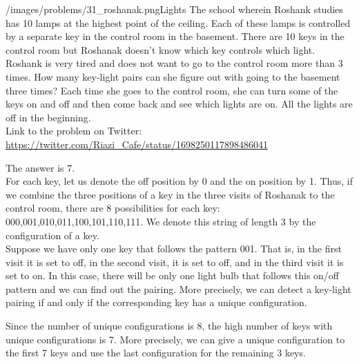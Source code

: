 \begin{problem}{/images/problems/31_roshanak.png}{Lights} 
    The school wherein Roshank studies has 10 lamps at the highest point of the ceiling. Each of these lamps is controlled by a separate key in the control room in the basement. There are 10 keys in the control room but Roshanak doesn't know which key controls which light.\\[0.2cm]

Roshank is very tired and does not want to go to the control room more than 3 times. How many key-light pairs can she figure out with going to the basement three times? Each time she goes to the control room, she can turn some of the keys on and off and then come back and see which lights are on. All the lights are off in the beginning.\\[0.2cm]

Link to the problem on Twitter:  \url{https://twitter.com/Riazi_Cafe/status/1698250117898486041}
\end{problem}
\begin{solution}
The answer is  7.\\[0.2cm]

For each key, let us denote the off position by 0 and the on position by 1. Thus, if we combine the three positions of a key in the three visits of Roshanak to the control room, there are 8 possibilities for each key: 000,001,010,011,100,101,110,111. We denote this string of length 3 by the configuration of a key.\\[0.2cm]

Suppose we have only one key that follows the pattern 001. That is, in the first visit it is set to off, in the second visit, it is set to off, and in the third visit it is set to on. In this case, there will be only one light bulb that follows this on/off pattern and we can find out the pairing. More precisely, we can detect a key-light pairing if and only if the corresponding key has a unique configuration.

Since the number of unique configurations is 8, the high number of keys with unique configurations is 7. More precisely, we can give a unique configuration to the first 7 keys and use the last configuration for the remaining 3 keys. 

\end{solution}